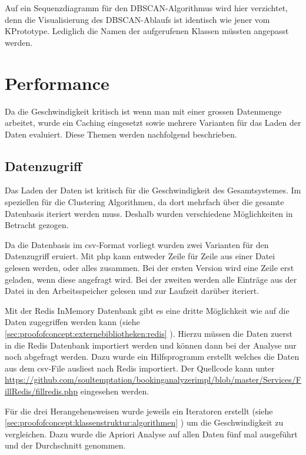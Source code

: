 Auf ein Sequenzdiagramm für den DBSCAN-Algorithmus wird hier verzichtet, denn die Visualisierung des DBSCAN-Ablaufs ist identisch wie jener vom KPrototype. Lediglich die Namen der aufgerufenen Klassen müssten angepasst werden.


\section{Performance}
\label{sec:proofofconcept:performance}
Da die Geschwindigkeit kritisch ist wenn man mit einer grossen Datenmenge arbeitet, wurde ein Caching eingesetzt sowie mehrere Varianten für das Laden der Daten evaluiert. Diese Themen werden nachfolgend beschrieben.

\subsection{Datenzugriff}
\label{sec:proofofconcept:performance:datenzugriff}
Das Laden der Daten ist kritisch für die Geschwindigkeit des Gesamtsystemes. Im speziellen für die Clustering Algorithmen, da dort mehrfach über die gesamte Datenbasis iteriert werden muss. Deshalb wurden verschiedene Möglichkeiten in Betracht gezogen.

Da die Datenbasis im \gls{csv}-Format vorliegt wurden zwei Varianten für den Datenzugriff eruiert. Mit \gls{php} kann entweder Zeile für Zeile aus einer Datei gelesen werden, oder alles zusammen.  Bei der ersten Version wird eine Zeile erst geladen, wenn diese angefragt wird. Bei der zweiten werden alle Einträge aus der Datei in den Arbeitsspeicher gelesen und zur Laufzeit darüber iteriert.

Mit der Redis InMemory Datenbank gibt es eine dritte Möglichkeit wie auf die Daten zugegriffen werden kann (siehe \cref{sec:proofofconcept:externebibliotheken:redis} ). Hierzu müssen die Daten zuerst in die Redis Datenbank importiert werden und können dann bei der Analyse nur noch abgefragt werden. Dazu wurde ein Hilfsprogramm erstellt welches die Daten aus dem \gls{csv}-File ausliest nach Redis importiert. Der Quellcode kann unter \url{https://github.com/soultemptation/bookinganalyzerimpl/blob/master/Services/FillRedis/fillredis.php} eingesehen werden.

Für die drei Herangehensweisen wurde jeweils ein Iteratoren erstellt (siehe \cref{sec:proofofconcept:klassenstruktur:algorithmen} ) um die Geschwindigkeit zu vergleichen. Dazu wurde die Apriori Analyse auf allen Daten fünf mal ausgeführt und der Durchschnitt genommen.

